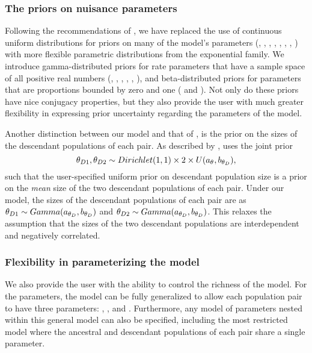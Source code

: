 \documentclass[letterpaper,12pt]{article}
\begin{document}
\begin{linenumbers}
\subsubsection*{The priors on nuisance parameters}
Following the recommendations of \citet{Oaks2012}, we have replaced the use of
continuous uniform distributions for priors on many of the
model's parameters (\divTime{}, \ancestralTheta{}, ,
, , ,
\recombinationRate, \migrationRate{}) with more flexible parametric
distributions from the exponential family.
We introduce gamma-distributed priors for rate parameters that have a sample
space of all positive real numbers (\divTime{}, \ancestralTheta{},
, , \recombinationRate,
\migrationRate{}), and beta-distributed priors for parameters that are
proportions bounded by zero and one ( and
).
Not only do these priors have nice conjugacy properties, but they also provide
the user with much greater flexibility in expressing prior uncertainty
regarding the parameters of the model.

Another distinction between our model and that of \msb, is the prior on the
sizes of the descendant populations of each pair.
As described by \citet{Oaks2012}, \msb uses the joint prior
\begin{equation}
    \descendantTheta{1}{}, \descendantTheta{2}{} \sim
    Dirichlet(1,1) \times 2 \times U(\uniformMin{\myTheta{}},
    \uniformMax{\descendantTheta{}{}}),
    \label{eq:jointThetaPrior}
\end{equation}
such that the user-specified uniform prior on descendant population
size is a prior on the \emph{mean} size of the two descendant
populations of each pair.
Under our model, the sizes of the descendant populations of each
pair are \iid as
$\descendantTheta{1}{} \sim Gamma(\gammaShape{\descendantTheta{}{}},
\gammaScale{\descendantTheta{}{}})$
and
$\descendantTheta{2}{} \sim Gamma(\gammaShape{\descendantTheta{}{}},
\gammaScale{\descendantTheta{}{}})$.
This relaxes the assumption that the sizes of the two descendant populations
are interdependent and negatively correlated.

\subsubsection*{Flexibility in parameterizing the model}
We also provide the user with the ability to control the richness of
the model.
For the \myTheta{} parameters, the model can be fully generalized to
allow each population pair to have three parameters:
\ancestralTheta{}, , and .
Furthermore, any model of \myTheta{} parameters nested within this
general model can also be specified, including the most restricted model
where the ancestral and descendant populations of each pair share
a single \myTheta{} parameter.


\end{linenumbers}
\end{document}
